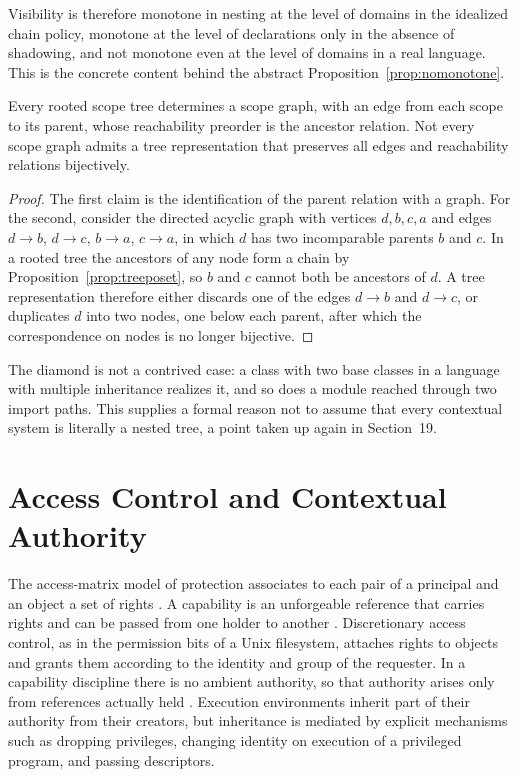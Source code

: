 Visibility is therefore monotone in nesting at the level of domains in the idealized chain policy, monotone at the level of declarations only in the absence of shadowing, and not monotone even at the level of domains in a real language. This is the concrete content behind the abstract Proposition~\ref{prop:nomonotone}.

\begin{proposition}\label{prop:graphgen}
Every rooted scope tree determines a scope graph, with an edge from each scope to its parent, whose reachability preorder is the ancestor relation. Not every scope graph admits a tree representation that preserves all edges and reachability relations bijectively.
\end{proposition}
\begin{proof}
The first claim is the identification of the parent relation with a graph. For the second, consider the directed acyclic graph with vertices $d,b,c,a$ and edges $d\to b$, $d\to c$, $b\to a$, $c\to a$, in which $d$ has two incomparable parents $b$ and $c$. In a rooted tree the ancestors of any node form a chain by Proposition~\ref{prop:treeposet}, so $b$ and $c$ cannot both be ancestors of $d$. A tree representation therefore either discards one of the edges $d\to b$ and $d\to c$, or duplicates $d$ into two nodes, one below each parent, after which the correspondence on nodes is no longer bijective.
\end{proof}

The diamond is not a contrived case: a class with two base classes in a language with multiple inheritance realizes it, and so does a module reached through two import paths. This supplies a formal reason not to assume that every contextual system is literally a nested tree, a point taken up again in Section~19.

\section{Access Control and Contextual Authority}

The access-matrix model of protection associates to each pair of a principal and an object a set of rights \cite{lampson}. A capability is an unforgeable reference that carries rights and can be passed from one holder to another \cite{dennisvanhorn}. Discretionary access control, as in the permission bits of a Unix filesystem, attaches rights to objects and grants them according to the identity and group of the requester. In a capability discipline there is no ambient authority, so that authority arises only from references actually held \cite{capmyths}. Execution environments inherit part of their authority from their creators, but inheritance is mediated by explicit mechanisms such as dropping privileges, changing identity on execution of a privileged program, and passing descriptors.

